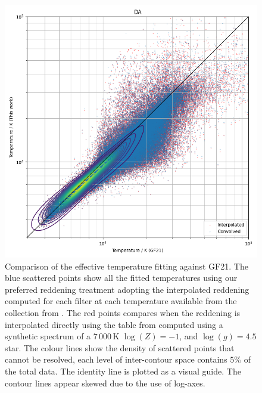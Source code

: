 \documentclass[fleqn,usenatbib]{rasti}
\begin{document}
\begin{figure}
    \centering
    \includegraphics[width=\columnwidth]{fig_04_compare_fusillo_edr3.png}
    \caption{Comparison of the effective temperature fitting against GF21. The blue scattered points show all the fitted temperatures using our preferred reddening treatment adopting the interpolated reddening computed for each filter at each temperature available from the collection from \citet{2010MmSAI..81..921K}. The red points compares when the reddening is interpolated directly using the table from \citet{2011ApJ...737..103S} computed using a synthetic spectrum of a $7\,000$\,K  $\log(Z) = -1$, and $\log(g) = 4.5$ star. The colour lines show the density of scattered points that cannot be resolved, each level of inter-contour space contains $5\%$ of the total data. The identity line is plotted as a visual guide. The contour lines appear skewed due to the use of log-axes.}
    \label{fig:comparison}
\end{figure}
\end{document}

